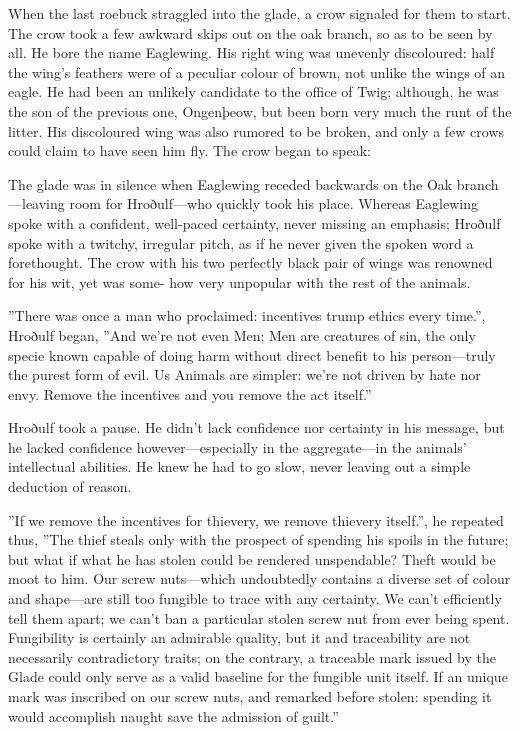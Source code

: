 When the last roebuck straggled into the glade, a crow signaled for them to start. The crow took a few awkward skips out on the oak branch, so as to be seen by all. He bore the name Eaglewing. His right wing was unevenly discoloured: half the wing's feathers were of a peculiar colour of brown, not unlike the wings of an eagle. He had been an unlikely candidate to the office of Twig; although, he was the son of the previous one, Ongenþeow, but been born very much the runt of the litter. His discoloured wing was also rumored to be broken, and only a few crows could claim to have seen him fly. The crow began to speak:



The glade was in silence when Eaglewing receded backwards on the Oak branch—leaving room for Hroðulf—who quickly took his place. Whereas Eaglewing spoke with a confident, well-paced certainty, never missing an emphasis; Hroðulf spoke with a twitchy, irregular pitch, as if he never given the spoken word a forethought. The crow with his two perfectly black pair of wings was renowned for his wit, yet was some-
how very unpopular with the rest of the animals. 

”There was once a man who proclaimed: incentives trump ethics every time.”, Hroðulf began, ”And we're not even Men; Men are creatures of sin, the only specie known capable of doing harm without direct benefit to his person---truly the purest form of evil. Us Animals are simpler: we're not driven by hate nor envy. Remove the incentives and you remove the act itself.”

Hroðulf took a pause. He didn't lack confidence nor certainty in his message, but he lacked confidence however---especially in the aggregate---in the animals' intellectual abilities. He knew he had to go slow, never leaving out a simple deduction of reason.

”If we remove the incentives for thievery, we remove thievery itself.”, he repeated thus, ”The thief steals only with the prospect of spending his spoils in the future; but what if what he has stolen could be rendered unspendable? Theft would be moot to him. Our screw nuts---which undoubtedly contains a diverse set of colour and shape---are still too fungible to trace with any certainty. We can't efficiently tell them apart; we can't ban a particular stolen screw nut from ever being spent. Fungibility is certainly an admirable quality, but it and traceability are not necessarily contradictory traits; on the contrary, a traceable mark issued by the Glade could only serve as a valid baseline for the fungible unit itself. If an unique mark was inscribed on our screw nuts, and remarked before stolen: spending it would accomplish naught save the admission of guilt.”

